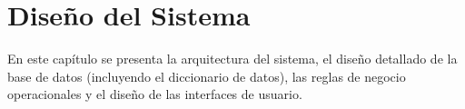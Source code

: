 \newpage

\section{Diseño del Sistema}

En este cap\'itulo se presenta la arquitectura del sistema, el dise\~no detallado
de la base de datos (incluyendo el diccionario de datos), las reglas de negocio
operacionales y el dise\~no de las interfaces de usuario.

\newcommand{\dictable}[2]{%
  \subsubsection{Tabla: #1}
  {\justifying #2 \par}
  \vspace{6pt}
  \setstretch{1.2}
  \rowcolors{2}{altrow}{white}%
  \begin{longtable}{>{\raggedright\arraybackslash\ttfamily}p{3.5cm}
                  >{\raggedright\arraybackslash\ttfamily}p{2.2cm}
                  >{\centering\arraybackslash}p{1cm}
                  >{\centering\arraybackslash}p{1cm}
                  >{\raggedright\arraybackslash}p{6.8cm}}
  \caption{Diccionario de datos: tabla #1} \label{tab:dd_#1} \\
  \hline
  \thead{Campo} & \thead{Tipo} & \thead{Nulo} & \thead{Clave} & \thead{Descripción} \\
  \hline
  \endfirsthead
  \caption[]{TABLA \thetable{} (Continuación)} \\
  \hline
  \thead{Campo} & \thead{Tipo} & \thead{Nulo} & \thead{Clave} & \thead{Descripción} \\
  \hline
  \endhead
  \hline
  \endfoot
}

\newcommand{\campo}[5]{%
  #1 & #2 & #3 & #4 & #5 \\
}

\newcommand{\dictableend}{%
  \end{longtable}
  \setstretch{1.5}
  \vspace{12pt}
}
